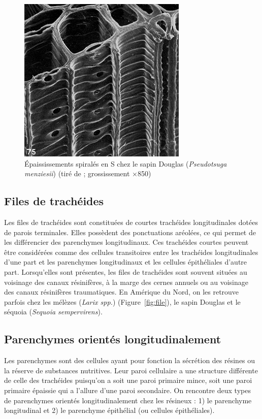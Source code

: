 \begin{figure}[h]
\centering
\includegraphics[scale=1]{img/epaississements}
\caption{Épaississements spiralés en S chez le sapin Douglas (\textit{Pseudotsuga menziesii}) (tiré de \cite{butterfield2012three}; grossissement $\times$850)}
\label{fig:epaississ}
\end{figure}

\subsection{Files de trachéides}

Les files de trachéides sont constituées de courtes trachéides longitudinales dotées de parois terminales. Elles possèdent des ponctuations aréolées, ce qui permet de les différencier des parenchymes longitudinaux. Ces trachéides courtes peuvent être considérées comme des cellules transitoires entre les trachéides longitudinales d'une part et les parenchymes longitudinaux et les cellules épithéliales d'autre part. Lorsqu'elles sont présentes, les files de trachéides sont souvent situées au voisinage des canaux résinifères, à la marge des cernes annuels ou au voisinage des canaux résinifères traumatiques. En Amérique du Nord, on les retrouve parfois chez les mélèzes (\textit{Larix spp.}) (Figure~\ref{fig:file}), le sapin Douglas et le séquoia (\textit{Sequoia sempervirens}).

\subsection{Parenchymes orientés longitudinalement}

Les parenchymes sont des cellules ayant pour fonction la sécrétion des résines ou la réserve de substances nutritives. Leur paroi cellulaire a une structure différente de celle des trachéides puisqu'on a soit une paroi primaire mince, soit une paroi primaire épaissie qui a l'allure d'une paroi secondaire. On rencontre deux types de parenchymes orientés longitudinalement chez les résineux : 1) le parenchyme longitudinal et 2) le parenchyme épithélial (ou cellules épithéliales).

